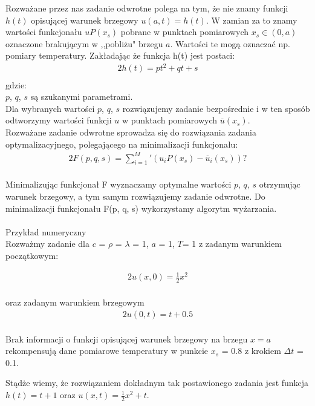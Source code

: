 \documentclass[twoside]{projektInzynierskiMS1}
\newcommand{\newLine}{~\\}
\begin{document}
Rozważane przez nas zadanie odwrotne polega na tym, że nie znamy funkcji $h(t)$ opisującej warunek brzegowy $u(a, t) = h(t)$.
W zamian za to znamy wartości funkcjonału $uP(x_s)$ pobrane w punktach pomiarowych $x_s \in (0, a)$
oznaczone brakującym w ,,pobliżu" brzegu $a$. Wartości te mogą oznaczać np. pomiary temperatury.
Zakładając że funkcja h(t) jest postaci:
\begin{alignat*}{2}
h(t) = pt^2 +qt  + s\\
\end{alignat*}
gdzie: \\
$p$, $q$, $s$ są szukanymi parametrami. \\

Dla wybranych wartości $p$, $q$, $s$ rozwiązujemy zadanie bezpośrednie i w ten sposób odtworzymy wartości funkcji $u$ w punktach pomiarowych $\overline u (x_s)$. \\


Rozważane zadanie odwrotne sprowadza się do rozwiązania zadania optymalizacyjnego, polegającego na minimalizacji funkcjonału:
\begin{alignat*}{2}
F(p, q, s) = \sum_{i=1}^M\prime (u_i P (x_s) - \overline u_i (x_s))?\\
\end{alignat*}

Minimalizując funkcjonał F wyznaczamy optymalne wartości $p$, $q$, $s$  otrzymując warunek brzegowy, a tym samym rozwiązujemy zadanie odwrotne.
Do minimalizacji funkcjonału F(p, q, s) wykorzystamy algorytm wyżarzania. \\ \newLine

Przykład numeryczny\\

Rozważmy zadanie dla $c$ = $\rho$ = $\lambda$ = 1, $a$ = 1, $T$= 1 z zadanym warunkiem początkowym:

\begin{alignat*}{2}
u(x, 0) = \frac{1}{2} x^2\\
\end{alignat*}

oraz zadanym warunkiem brzegowym
\begin{alignat*}{2}
u(0, t) = t + 0.5\\
\end{alignat*}


Brak informacji o funkcji opisującej warunek brzegowy na brzegu $x = a$ rekompensują dane pomiarowe temperatury w punkcie $x_s$ = 0.8 z krokiem $\Delta t$ = 0.1.

Stądże wiemy, że rozwiązaniem dokładnym tak postawionego zadania jest funkcja $h(t) = t+1$ oraz $u(x, t) = \frac{1}{2}x^2 +t$.
\end{document}
